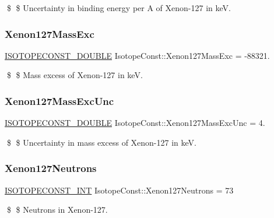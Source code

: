 \$ \$ Uncertainty in binding energy per A of Xenon-\/127 in keV. \mbox{\label{group___isotope_const-_xenon-_xe127_ga29d6fa837ee480be98c44093702b10e2}} 
\subsubsection{\texorpdfstring{Xenon127\+Mass\+Exc}{Xenon127MassExc}}
{\footnotesize\ttfamily \mbox{\hyperlink{group___isotope_const-_macros_ga8f45a7272ce02c0b4c65c44636ed719a}{I\+S\+O\+T\+O\+P\+E\+C\+O\+N\+S\+T\+\_\+\+D\+O\+U\+B\+LE}} Isotope\+Const\+::\+Xenon127\+Mass\+Exc = -\/88321.}

\$ \$ Mass excess of Xenon-\/127 in keV. \mbox{\label{group___isotope_const-_xenon-_xe127_gab3b735c8d01f4b8477f5801725c14d79}} 
\subsubsection{\texorpdfstring{Xenon127\+Mass\+Exc\+Unc}{Xenon127MassExcUnc}}
{\footnotesize\ttfamily \mbox{\hyperlink{group___isotope_const-_macros_ga8f45a7272ce02c0b4c65c44636ed719a}{I\+S\+O\+T\+O\+P\+E\+C\+O\+N\+S\+T\+\_\+\+D\+O\+U\+B\+LE}} Isotope\+Const\+::\+Xenon127\+Mass\+Exc\+Unc = 4.}

\$ \$ Uncertainty in mass excess of Xenon-\/127 in keV. \mbox{\label{group___isotope_const-_xenon-_xe127_gaac12a4b6c26128ddf1be9584f68dd540}} 
\subsubsection{\texorpdfstring{Xenon127\+Neutrons}{Xenon127Neutrons}}
{\footnotesize\ttfamily \mbox{\hyperlink{group___isotope_const-_macros_ga5f18360b3e99483a35c32d789e62621c}{I\+S\+O\+T\+O\+P\+E\+C\+O\+N\+S\+T\+\_\+\+I\+NT}} Isotope\+Const\+::\+Xenon127\+Neutrons = 73}

\$ \$ Neutrons in Xenon-\/127. \mbox{\label{group___isotope_const-_xenon-_xe127_ga64d219780d5b7b4f2973bfa3cde0aac0}} 
